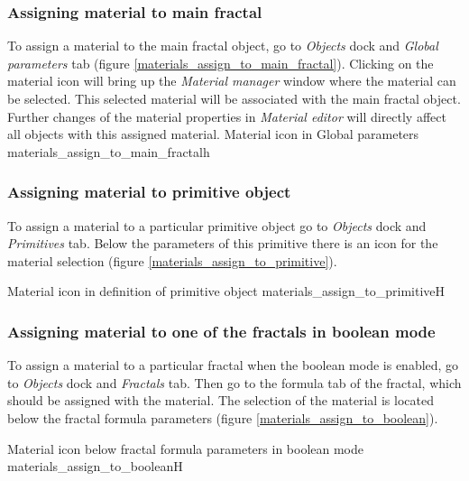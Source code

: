 \subsubsection{Assigning material to main fractal}\label{assigning-material-to-main-fractal}

To assign a material to the main fractal object, go to \emph{Objects} dock and \emph{Global parameters} tab (figure \ref{materials_assign_to_main_fractal}). Clicking on the material icon will bring up the \emph{Material manager} window where the material can be selected. This selected material will be associated with the main fractal object. Further changes of the material properties in \emph{Material editor} will directly affect all objects with this assigned material.
\nopagebreak
{}
{Material icon in Global parameters}
{materials_assign_to_main_fractal}{h}

\subsubsection{Assigning material to primitive object}\label{assigning-material-to-primitive}

To assign a material to a particular primitive object go to \emph{Objects} dock and \emph{Primitives} tab. Below the parameters of this primitive there is an icon for the material selection (figure \ref{materials_assign_to_primitive}).
 
\nopagebreak
{}
{Material icon in definition of primitive object}
{materials_assign_to_primitive}{H}

\subsubsection{Assigning material to one of the fractals in boolean mode}\label{assigning-material-to-boolean}

To assign a material to a particular fractal when the boolean mode is enabled, go to \emph{Objects} dock and \emph{Fractals} tab. Then go to the formula tab of the fractal, which should be assigned with the material. The selection of the material is located below the fractal formula parameters (figure \ref{materials_assign_to_boolean}).

\nopagebreak
{}
{Material icon below fractal formula parameters in boolean mode}
{materials_assign_to_boolean}{H}

